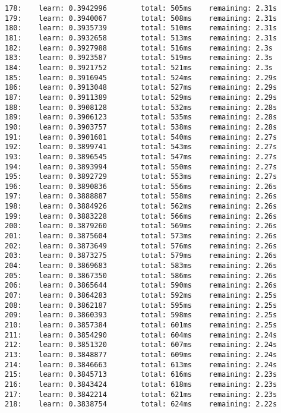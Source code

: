 \documentclass[11pt]{article}
\begin{document}
\begin{Verbatim}[commandchars=\\\{\}]
178:    learn: 0.3942996        total: 505ms    remaining: 2.31s
179:    learn: 0.3940067        total: 508ms    remaining: 2.31s
180:    learn: 0.3935739        total: 510ms    remaining: 2.31s
181:    learn: 0.3932658        total: 513ms    remaining: 2.31s
182:    learn: 0.3927988        total: 516ms    remaining: 2.3s
183:    learn: 0.3923587        total: 519ms    remaining: 2.3s
184:    learn: 0.3921752        total: 521ms    remaining: 2.3s
185:    learn: 0.3916945        total: 524ms    remaining: 2.29s
186:    learn: 0.3913048        total: 527ms    remaining: 2.29s
187:    learn: 0.3911389        total: 529ms    remaining: 2.29s
188:    learn: 0.3908128        total: 532ms    remaining: 2.28s
189:    learn: 0.3906123        total: 535ms    remaining: 2.28s
190:    learn: 0.3903757        total: 538ms    remaining: 2.28s
191:    learn: 0.3901601        total: 540ms    remaining: 2.27s
192:    learn: 0.3899741        total: 543ms    remaining: 2.27s
193:    learn: 0.3896545        total: 547ms    remaining: 2.27s
194:    learn: 0.3893994        total: 550ms    remaining: 2.27s
195:    learn: 0.3892729        total: 553ms    remaining: 2.27s
196:    learn: 0.3890836        total: 556ms    remaining: 2.26s
197:    learn: 0.3888887        total: 558ms    remaining: 2.26s
198:    learn: 0.3884926        total: 562ms    remaining: 2.26s
199:    learn: 0.3883228        total: 566ms    remaining: 2.26s
200:    learn: 0.3879260        total: 569ms    remaining: 2.26s
201:    learn: 0.3875604        total: 573ms    remaining: 2.26s
202:    learn: 0.3873649        total: 576ms    remaining: 2.26s
203:    learn: 0.3873275        total: 579ms    remaining: 2.26s
204:    learn: 0.3869683        total: 583ms    remaining: 2.26s
205:    learn: 0.3867350        total: 586ms    remaining: 2.26s
206:    learn: 0.3865644        total: 590ms    remaining: 2.26s
207:    learn: 0.3864283        total: 592ms    remaining: 2.25s
208:    learn: 0.3862187        total: 595ms    remaining: 2.25s
209:    learn: 0.3860393        total: 598ms    remaining: 2.25s
210:    learn: 0.3857384        total: 601ms    remaining: 2.25s
211:    learn: 0.3854290        total: 604ms    remaining: 2.24s
212:    learn: 0.3851320        total: 607ms    remaining: 2.24s
213:    learn: 0.3848877        total: 609ms    remaining: 2.24s
214:    learn: 0.3846663        total: 613ms    remaining: 2.24s
215:    learn: 0.3845713        total: 616ms    remaining: 2.23s
216:    learn: 0.3843424        total: 618ms    remaining: 2.23s
217:    learn: 0.3842214        total: 621ms    remaining: 2.23s
218:    learn: 0.3838754        total: 624ms    remaining: 2.22s

\end{Verbatim}
\end{document}
